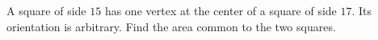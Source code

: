 A square of side $15$ has one vertex at the center of a square of side $17$. Its orientation is arbitrary. Find the area common to the two squares.
